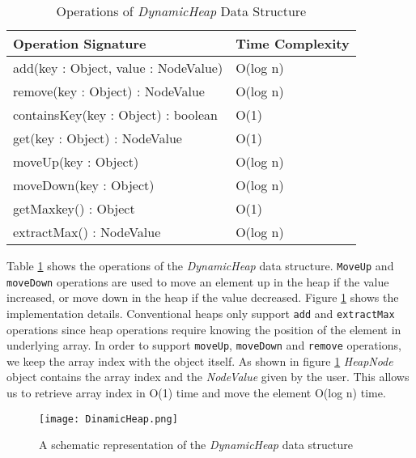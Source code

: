 \begin{table}
\centering
\caption{Operations of \textit{DynamicHeap} Data Structure}
\begin{tabular}{|l|l|} \hline
Operation Signature & Time Complexity \\ \hline \hline
add(key : Object, value : NodeValue) & O(log n) \\ \hline
remove(key : Object) : NodeValue & O(log n) \\ \hline
containsKey(key : Object) : boolean & O(1) \\ \hline
get(key : Object) : NodeValue & O(1) \\ \hline
moveUp(key : Object) & O(log n) \\ \hline
moveDown(key : Object) & O(log n) \\ \hline
getMaxkey() : Object & O(1) \\ \hline
extractMax() : NodeValue & O(log n) \\ \hline
\end{tabular}
\label{dynamicheap_api}
\end{table}

Table \ref{dynamicheap_api} shows the operations of the \textit{DynamicHeap} data structure. \texttt{MoveUp} and \texttt{moveDown} operations are used to move an element up in the heap if the value increased, or move down in the heap if the value decreased. Figure \ref{dynamicheap_impl} shows the implementation details. Conventional heaps only support \texttt{add} and \texttt{extractMax} operations since heap operations require knowing the position of the element in underlying array. In order to support \texttt{moveUp}, \texttt{moveDown} and \texttt{remove} operations, we keep the array index with the object itself. As shown in figure \ref{dynamicheap_impl} \textit{HeapNode} object contains the array index and the \textit{NodeValue} given by the user. This allows us to retrieve array index in O(1) time and move the element O(log n) time.


\begin{figure}[!t]
        \centering
        \texttt{[image: DinamicHeap.png]}
        \caption {A schematic representation of the \textit{DynamicHeap} data structure}
        \label{dynamicheap_impl}
\end{figure}

